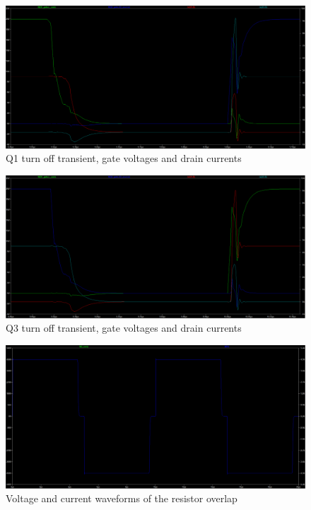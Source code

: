 \begin{figure}[H]
	\centering
	\includegraphics[width=\textwidth]{pictures/implementation/cap/cap_gates_2.PNG}
	\caption{Q1 turn off transient, gate voltages and drain currents}
	\label{fig:cap_gates_2}
\end{figure}

\begin{figure}[H]
	\centering
	\includegraphics[width=\textwidth]{pictures/implementation/cap/cap_gates_3.PNG}
	\caption{Q3 turn off transient, gate voltages and drain currents}
	\label{fig:cap_gates_3}
\end{figure}

\begin{figure}[H]
	\centering
	\includegraphics[width=\textwidth]{pictures/implementation/cap/cap_load.PNG}
	\caption{Voltage and current waveforms of the resistor overlap}
	\label{fig:cap_load}
\end{figure}